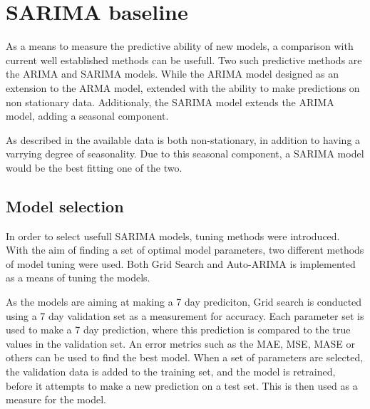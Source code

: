 
\section{SARIMA baseline}
\label{section:Architecture:Baselines:Arima}

\iffalse
This section presents the overarching methods and method architectures used in this paper.
In an effort to analyse data and make predictions on the problem space, predictive models are applied.
Using well established methods, we intend on creating baseline predictions in order to evaluate a new model.
These baseline methods are pressented here.
\fi


As a means to measure the predictive ability of new models, a comparison with current well established methods can be usefull.
Two such predictive methods are the ARIMA and SARIMA models.
While the ARIMA model designed as an extension to the ARMA model, extended with the ability to make predictions on non stationary data.
Additionaly, the SARIMA model extends the ARIMA model, adding a seasonal component.

As described in  the available data is both non-stationary, in addition to having a varrying degree of seasonality.
Due to this seasonal component, a SARIMA model would be the best fitting one of the two.


\subsection{Model selection}
In order to select usefull SARIMA models, tuning methods were introduced.
With the aim of finding a set of optimal model parameters, two different methods of model tuning were used.
Both Grid Search and Auto-ARIMA is implemented as a means of tuning the models.%

As the models are aiming at making a 7 day prediciton, Grid search is conducted using a 7 day validation set as a measurement for accuracy.
Each parameter set is used to make a 7 day prediction, where this prediction is compared to the true values in the validation set.
An error metrics such as the MAE, MSE, MASE or others can be used to find the best model.
When a set of parameters are selected, the validation data is added to the training set, and the model is retrained, before it attempts to make a new prediction on a test set.
This is then used as a measure for the model.

